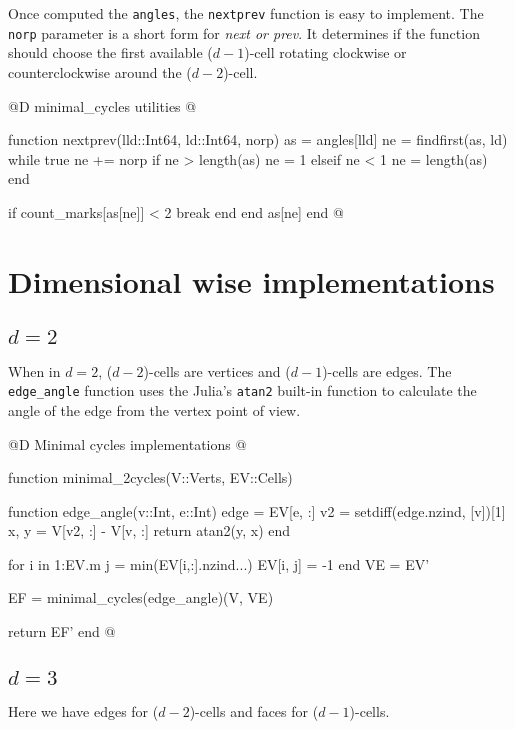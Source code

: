 Once computed the \texttt{angles}, the \texttt{nextprev} function is
easy to implement. The \texttt{norp} parameter is a short form for \textit{next or prev}. 
It determines if the function should choose the first available
($d-1$)-cell rotating clockwise or counterclockwise around the ($d-2$)-cell.

@D minimal\_cycles utilities
@{function nextprev(lld::Int64, ld::Int64, norp)
    as = angles[lld]
    ne = findfirst(as, ld)
    while true
        ne += norp
        if ne > length(as)
            ne = 1
        elseif ne < 1
            ne = length(as)
        end

        if count_marks[as[ne]] < 2
            break
        end
    end
    as[ne]
end
@}



\section{Dimensional wise implementations}
\label{sec:angles_fn}

\subsection{$d=2$}

When in $d=2$, ($d-2$)-cells are vertices and ($d-1$)-cells are edges.
The \texttt{edge\_angle} function uses the Julia's \texttt{atan2} 
built-in function to calculate the angle of the edge from the vertex point of view.

@D Minimal cycles implementations
@{function minimal_2cycles(V::Verts, EV::Cells)

    function edge_angle(v::Int, e::Int)
        edge = EV[e, :]
        v2 = setdiff(edge.nzind, [v])[1]
        x, y = V[v2, :] - V[v, :]
        return atan2(y, x)
    end

    for i in 1:EV.m
        j = min(EV[i,:].nzind...)
        EV[i, j] = -1
    end
    VE = EV'

    EF = minimal_cycles(edge_angle)(V, VE)

    return EF'
end
@}


\subsection{$d=3$}

Here we have edges for ($d-2$)-cells and faces for ($d-1$)-cells.


